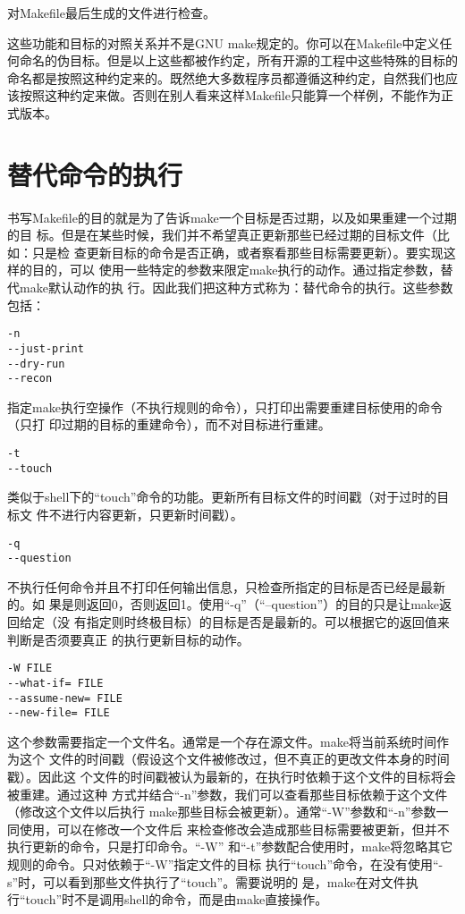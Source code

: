 对Makefile最后生成的文件进行检查。

这些功能和目标的对照关系并不是GNU make规定的。你可以在Makefile中定义任何命名的伪目标。但是以上这些都被作约定，所有开源的工程中这些特殊的目标的命名都是按照这种约定来的。既然绝大多数程序员都遵循这种约定，自然我们也应该按照这种约定来做。否则在别人看来这样Makefile只能算一个样例，不能作为正式版本。


\section{替代命令的执行}
书写Makefile的目的就是为了告诉make一个目标是否过期，以及如果重建一个过期的目
标。但是在某些时候，我们并不希望真正更新那些已经过期的目标文件（比如：只是检
查更新目标的命令是否正确，或者察看那些目标需要更新）。要实现这样的目的，可以
使用一些特定的参数来限定make执行的动作。通过指定参数，替代make默认动作的执
行。因此我们把这种方式称为：替代命令的执行。这些参数包括：

\begin{Verbatim}[]
-n
--just-print
--dry-run
--recon
\end{Verbatim}
指定make执行空操作（不执行规则的命令），只打印出需要重建目标使用的命令（只打
印过期的目标的重建命令），而不对目标进行重建。

\begin{Verbatim}[]
-t
--touch
\end{Verbatim}
类似于shell下的“touch”命令的功能。更新所有目标文件的时间戳（对于过时的目标文
件不进行内容更新，只更新时间戳）。

\begin{Verbatim}[]
-q
--question
\end{Verbatim}
不执行任何命令并且不打印任何输出信息，只检查所指定的目标是否已经是最新的。如
果是则返回0，否则返回1。使用“-q”（“--question”）的目的只是让make返回给定（没
有指定则时终极目标）的目标是否是最新的。可以根据它的返回值来判断是否须要真正
的执行更新目标的动作。

\begin{Verbatim}[]
-W FILE
--what-if= FILE
--assume-new= FILE
--new-file= FILE
\end{Verbatim}
这个参数需要指定一个文件名。通常是一个存在源文件。make将当前系统时间作为这个
文件的时间戳（假设这个文件被修改过，但不真正的更改文件本身的时间戳）。因此这
个文件的时间戳被认为最新的，在执行时依赖于这个文件的目标将会被重建。通过这种
方式并结合“-n”参数，我们可以查看那些目标依赖于这个文件（修改这个文件以后执行
make那些目标会被更新）。通常“-W”参数和“-n”参数一同使用，可以在修改一个文件后
来检查修改会造成那些目标需要被更新，但并不执行更新的命令，只是打印命令。“-W”
和“-t”参数配合使用时，make将忽略其它规则的命令。只对依赖于“-W”指定文件的目标
执行“touch”命令，在没有使用“-s”时，可以看到那些文件执行了“touch”。需要说明的
是，make在对文件执行“touch”时不是调用shell的命令，而是由make直接操作。

